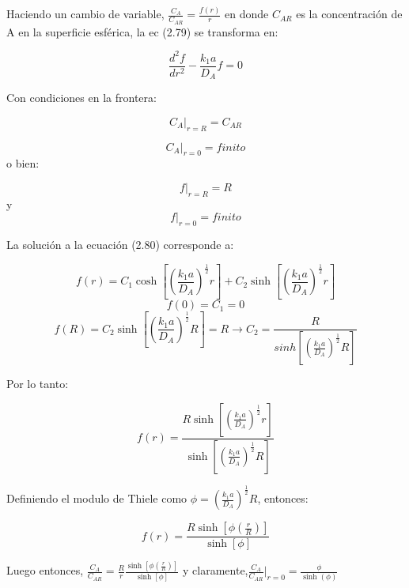 Haciendo un cambio de variable, $\frac{C_A}{C_{AR}}=\frac{f(r)}{r}$ en donde $C_{AR}$ es la concentración de A en la superficie esférica, la ec (2.79) se transforma en:

\begin{equation}
    \frac{d^2f}{dr^2}-\frac{k_1a}{D_A}f=0
\end{equation}

Con condiciones en la frontera:

\begin{equation*}
    C_A|_{r=R}=C_{AR}
\end{equation*}

\begin{equation}
    C_A|_{r=0}=finito
\end{equation}
o bien:

\begin{equation*}
    f|_{r=R}=R
\end{equation*}
y \begin{equation*}
    f|_{r=0}=finito
\end{equation*}

La solución a la ecuación (2.80) corresponde a:

\begin{equation}
    f(r)=C_1\cosh[(\frac{k_1a}{D_A})^\frac{1}{2}r]+C_2\sinh[(\frac{k_1a}{D_A})^\frac{1}{2}r]
\end{equation}
\begin{equation*}
    f(0)=C_1=0
\end{equation*}
\begin{equation*}
    f(R)=C_2\sinh[(\frac{k_1a}{D_A})^\frac{1}{2}R]=R\longrightarrow C_2=\frac{R}{sinh[(\frac{k_1a}{D_A})^\frac{1}{2}R]}
\end{equation*}

Por lo tanto:

\begin{equation}
    f(r)=\frac{R\sinh[(\frac{k_1a}{D_A})^\frac{1}{2}r]}{\sinh[(\frac{k_1a}{D_A})^\frac{1}{2}R]}
\end{equation}

Definiendo el modulo de Thiele como $\phi=(\frac{k_1a}{D_A})^\frac{1}{2}R$, entonces:

\begin{equation*}
    f(r)=\frac{R\sinh[\phi(\frac{r}{R})]}{\sinh[\phi]}
\end{equation*}

Luego entonces, $\frac{C_A}{C_{AR}}=\frac{R}{r}\frac{\sinh[\phi(\frac{r}{R})]}{\sinh[\phi]}$ y claramente,$\frac{C_A}{C_{AR}}|_{r=0}=\frac{\phi}{\sinh(\phi)}$ 

